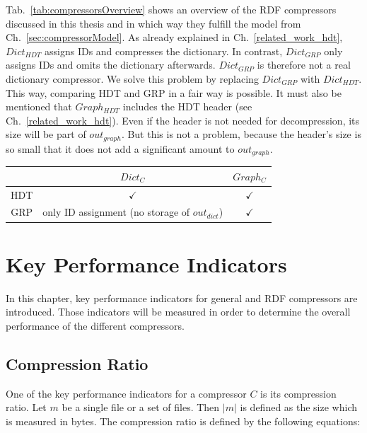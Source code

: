 Tab.~\ref{tab:compressorsOverview} shows an overview of the RDF compressors discussed in this thesis and in which way they fulfill the model from Ch.~\ref{sec:compressorModel}. As already explained in Ch.~\ref{related_work_hdt}, $Dict_{HDT}$ assigns IDs and compresses the dictionary. In contrast, $Dict_{GRP}$  only assigns IDs and omits the dictionary afterwards. $Dict_{GRP}$ is therefore not a real dictionary compressor. We solve this problem by replacing  $Dict_{GRP}$ with $Dict_{HDT}$. This way, comparing HDT and GRP in a fair way is possible. It must also be mentioned that $Graph_{HDT}$ includes the HDT header (see Ch.~\ref{related_work_hdt}). Even if the header is not needed for decompression, its size will be part of $out_{graph}$. But this is not a problem, because the header's size is so small that it does not add a significant amount to $out_{graph}$.

\begin{center}
	\begin{tabular}{|c|c|c|}
		\hline 
		& $Dict_{C}$ & $Graph_{C}$ \\ 
		\hline \hline
		HDT & $\checkmark$ & $\checkmark$  \\ 
		\hline 
		GRP & only ID assignment (no storage of $out_{dict}$) & $\checkmark$ \\ 
		\hline 
	\end{tabular} 
	\label{tab:compressorsOverview}
\end{center}

\section{Key Performance Indicators}

In this chapter, key performance indicators for general and RDF compressors are introduced. Those indicators will be measured in order to determine the overall performance of the different compressors.

\subsection{Compression Ratio}

One of the key performance indicators for a compressor $C$ is its compression ratio. Let $m$ be a single file or a set of files. Then $|m|$ is defined as the size which is measured in bytes. The compression ratio is defined by the following equations:


